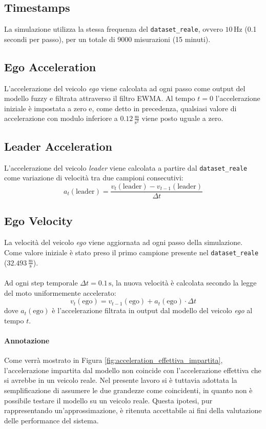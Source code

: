 \subsection{Timestamps}
La simulazione utilizza la stessa frequenza del \texttt{dataset\_reale}, 
ovvero $10\,\mathrm{Hz}$ (0.1 secondi per passo), per un totale di 9000 misurazioni (15 minuti).

\subsection{Ego Acceleration}
L'accelerazione del veicolo \emph{ego} viene calcolata ad ogni passo come output del modello fuzzy e filtrata attraverso il filtro EWMA.  
Al tempo $t=0$ l'accelerazione iniziale è impostata a zero e, come detto in precedenza, qualsiasi valore di accelerazione con modulo
inferiore a $0.12 \,\frac{\mathrm{m}}{\mathrm{s^2}}$ viene posto uguale a zero.

\subsection{Leader Acceleration}
L'accelerazione del veicolo \emph{leader} viene calcolata a partire dal \texttt{dataset\_reale} come 
variazione di velocità tra due campioni consecutivi:
\[
a_t(\mathrm{leader}) = \frac{v_t(\mathrm{leader}) - v_{t-1}(\mathrm{leader})}{\Delta t}
\]

\subsection{Ego Velocity}
La velocità del veicolo \emph{ego} viene aggiornata ad ogni passo della simulazione.
Come valore iniziale è stato preso il primo campione presente nel \texttt{dataset\_reale} ($32.493 \, \frac{\mathrm{m}}{\mathrm{s}}$).  
\\\\
\noindent Ad ogni step temporale $\Delta t = 0.1\,\mathrm{s}$, la nuova velocità è calcolata secondo la legge del moto uniformemente 
accelerato:
\[
v_t(\mathrm{ego}) = v_{t-1}(\mathrm{ego}) + a_t(\mathrm{ego}) \cdot \Delta t
\]
dove $a_t(\mathrm{ego})$ è l'accelerazione filtrata in output dal modello del veicolo \emph{ego} al tempo $t$.

\paragraph{Annotazione} Come verrà mostrato in Figura \ref{fig:acceleration_effettiva_impartita}, 
l'accelerazione impartita dal modello non coincide con l'accelerazione effettiva che si avrebbe in un veicolo reale.  
Nel presente lavoro si è tuttavia adottata la semplificazione di assumere le due grandezze come coincidenti, 
in quanto non è possibile testare il modello su un veicolo reale.  
Questa ipotesi, pur rappresentando un'approssimazione, è ritenuta accettabile ai fini della valutazione delle performance del sistema.

